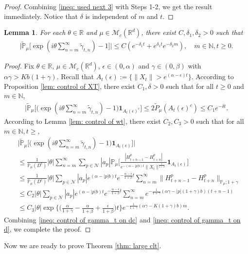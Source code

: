\documentclass[12pt,a4paper]{amsart}
\theoremstyle{plain}
\newtheorem{lem}[thm]{Lemma}
\theoremstyle{definition}
\numberwithin{equation}{section}
\begin{document}
\begin{proof}
    Combining \eqref{ineq: used next 3} with Steps 1-2, we get the result immediately. Notice that $\delta$ is independent of $m$ and $t$.
\end{proof}
\begin{lem}\label{lem: lemma05}
    For each $\theta\in \mathbb{R}$ and $\mu \in \mathcal{M}_c(\mathbb{R}^d)$, there exist  $C,\delta_1,\delta_2>0$ such that
\begin{align}
    \Big|\widetilde{\mathbb{P}}_{\mu}\Big[\exp(i\theta \sum_{n=m}^{\infty}\widetilde{\gamma}_{t,n})-1\Big]\Big|
    \leq C(e^{-\delta_1 t}+e^{\delta_1 t}e^{-\delta_2 m}),
    \quad m\in \mathbb{N}, t\geq 0.
\end{align}
\end{lem}
\begin{proof}
    Fix $\theta \in \mathbb R$, $\mu \in \mathcal M_c(\mathbb R^d)$, $\epsilon \in (0,\alpha)$ and $\gamma \in (0,\beta)$ with $\alpha \gamma > Kb(1+\gamma)$.
    Recall that $A_t(\epsilon):=\{\|X_t\|> e^{(\alpha-\epsilon) t}\}$.
    According to Proposition \ref{lem: control of XT}, there exist $C_1,\delta>0$ such that for all $t\geq 0$ and $m\in \mathbb N$,
\begin{align}\label{ineq: control of gamma_t on dc}
    \Big|\widetilde{\mathbb{P}}_{\mu}\Big[\big(\exp(i\theta \sum_{n=m}^{\infty}\widetilde{\gamma}_{t,n})-1\big)\mathbf{1}_{A_t(\epsilon)^c}\Big]
    \leq 2\widetilde{P}_{\mu}(A_t(\epsilon)^c)
    \leq C_1 e^{-\delta t}.
\end{align}
    According to Lemma \ref{lem: control of wt}, there exist $C_2,C_3>0$
    such that for all $m\in \mathbb{N}, t\geq$,
\begin{align}\label{ineq: control of gamma_t on d}
    &\Big|\widetilde{\mathbb{P}}_{\mu}\Big[\big(\exp(i\theta \sum_{n=m}^{\infty}\widetilde{\gamma}_{t,n})-1\big)\mathbf{1}_{A_t(\epsilon)}\Big]\Big|\\
    &\leq \frac{1}{\mathbb{P}_{\mu}(D^c)}|\theta|\sum_{n=m}^{\infty}\sum_{p\in \mathcal{N}}|a_p|\mathbb{P}_{\mu}\Big[\frac{|H_{t+n-1}^p-H_{t+n}^p|}{e^{-(\alpha-|p|b)t}\|X_t\|^{\frac{1}{1+\beta}}}\mathbf{1}_{A_t(\epsilon)}\Big]\\
    &\leq  \frac{1}{\mathbb{P}_{\mu}(D^c)}|\theta|\sum_{p\in \mathcal{N}}|a_p|e^{(\alpha-|p|b)t}e^{-\frac{\alpha-\epsilon}{1+\beta}t}\sum_{n=m}^{\infty}\|H_{t+n-1}^p-H_{t+n}^p\|_{\mathbb{P}_{\mu};1+\gamma}\\
    &\leq C_2|\theta|\sum_{p\in \mathcal{N}}|a_p|e^{(\alpha-|p|b)t}e^{-\frac{\alpha-\epsilon}{1+\beta}t}\sum_{n=m}^{\infty}e^{-\frac{1}{1+\gamma}(\alpha\gamma-|p|(1+\gamma)b)(t+n-1)}\\
    &\leq C_3|\theta|\exp\Big\{\Big(\frac{\alpha}{1+\gamma}-\frac{\alpha}{1+\beta}+\frac{\epsilon}{1+\beta}\Big)t\Big\}
    e^{-\frac{1}{1+\gamma}(\alpha\gamma-K(1+\gamma)b)m}.
\end{align}
    Combining \eqref{ineq: control of gamma_t on dc} and \eqref{ineq: control of gamma_t on d}, we complete the proof.
\end{proof}
    Now we are ready to prove Theorem \ref{thm: large clt}.
\medskip
\end{document}
